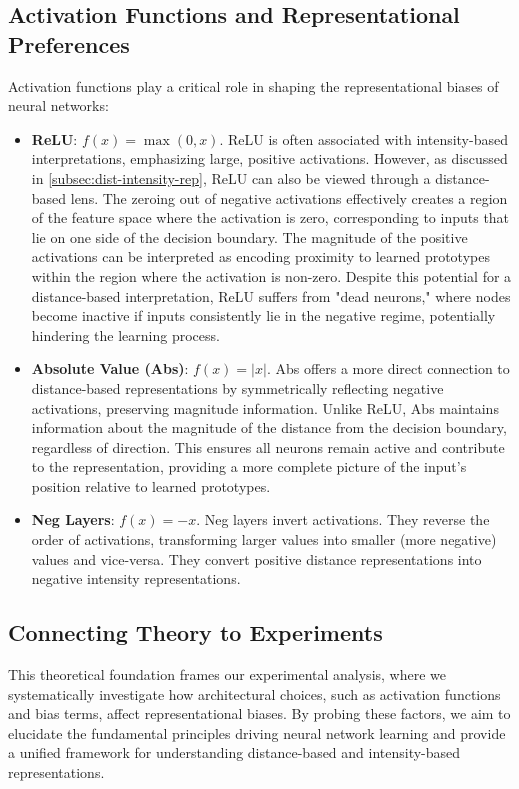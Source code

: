 \subsection{Activation Functions and Representational Preferences}

Activation functions play a critical role in shaping the representational biases of neural networks:
\begin{itemize}
    \item \textbf{ReLU}: $f(x) = \max(0, x)$. ReLU is often associated with intensity-based interpretations, emphasizing large, positive activations. However, as discussed in \ref{subsec:dist-intensity-rep}, ReLU can also be viewed through a distance-based lens. The zeroing out of negative activations effectively creates a region of the feature space where the activation is zero, corresponding to inputs that lie on one side of the decision boundary. The magnitude of the positive activations can be interpreted as encoding proximity to learned prototypes within the region where the activation is non-zero. Despite this potential for a distance-based interpretation, ReLU suffers from "dead neurons," where nodes become inactive if inputs consistently lie in the negative regime, potentially hindering the learning process.
    \item \textbf{Absolute Value (Abs)}: $f(x) = |x|$. Abs offers a more direct connection to distance-based representations by symmetrically reflecting negative activations, preserving magnitude information. Unlike ReLU, Abs maintains information about the magnitude of the distance from the decision boundary, regardless of direction. This ensures all neurons remain active and contribute to the representation, providing a more complete picture of the input's position relative to learned prototypes.
    \item \textbf{Neg Layers}: $f(x) = -x$. Neg layers invert activations. They reverse the order of activations, transforming larger values into smaller (more negative) values and vice-versa. They convert positive distance representations into negative intensity representations.
\end{itemize}

\subsection{Connecting Theory to Experiments}

This theoretical foundation frames our experimental analysis, where we systematically investigate how architectural choices, such as activation functions and bias terms, affect representational biases. By probing these factors, we aim to elucidate the fundamental principles driving neural network learning and provide a unified framework for understanding distance-based and intensity-based representations.
